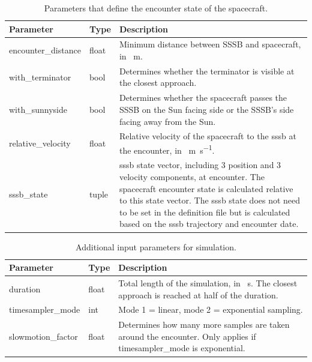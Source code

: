 \begin{table}[htpb]
    \caption{Parameters that define the encounter state of the spacecraft.}
    \label{tab:sc_enc_paras}
    \begin{tabular}{p{}|p{}|p{}}
        \textbf{Parameter}  & \textbf{Type} & \textbf{Description} \\ \hline
        encounter\_distance & float         & Minimum distance between SSSB and spacecraft, in \SI{}{\meter}. \\
        with\_terminator    & bool          & Determines whether the terminator is visible at the closest approach. \\
        with\_sunnyside     & bool          & Determines whether the spacecraft passes the SSSB on the Sun facing side or the SSSB's side facing away from the Sun. \\
        relative\_velocity  & float         & Relative velocity of the spacecraft to the \gls{sssb} at the encounter, in \SI{}{\meter\per\second}. \\
        sssb\_state         & tuple         & \gls{sssb} state vector, including 3 position and 3 velocity components, at encounter. The spacecraft encounter state is calculated relative to this state vector. The \gls{sssb} state does not need to be set in the  definition file but is calculated based on the \gls{sssb} trajectory and encounter date.
    \end{tabular}
\end{table}

\begin{table}[htpb]
    \caption{Additional input parameters for simulation.}
    \label{tab:sim_input_params}
    \begin{tabular}{p{}|p{}|p{}}
        \textbf{Parameter}  & \textbf{Type} & \textbf{Description} \\ \hline
        duration            & float         & Total length of the simulation, in \SI{}{\second}. The closest approach is reached at half of the duration. \\
        timesampler\_mode   & int           & Mode 1 = linear, mode 2 = exponential sampling.  \\
        slowmotion\_factor  & float         & Determines how many more samples are taken around the encounter. Only applies if timesampler\_mode is exponential. \\
    \end{tabular}
\end{table}



